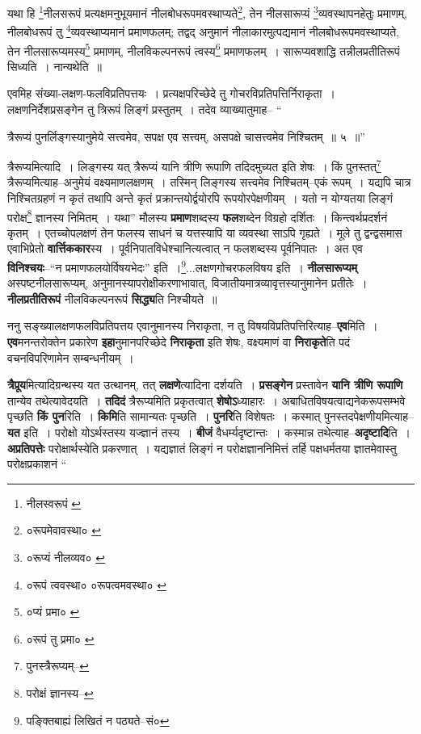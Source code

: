 \documentclass[article,12pt,a4paper]{memoir}
\begin{document}
	यथा हि \footnote{नीलस्वरूपं \cite{dp-msC} \cite{dp-msD}}नीलसरूपं प्रत्यक्षमनुभूयमानं नीलबोधरूपमवस्थाप्यते\footnote{०रूपमेवावस्था० \cite{dp-msC}}, तेन नीलसारूप्यं \footnote{०रूप्यं नीलव्यव० \cite{dp-msC}}व्यवस्थापनहेतुः प्रमाणम्, नीलबोधरूपं तु \footnote{०रूपं त्ववस्था० \cite{dp-msD} ०रूपत्वमवस्था० \cite{dp-msC}}व्यवस्थाप्यमानं प्रमाणफलम्; तद्वद् अनुमानं नीलाकारमुत्पद्यमानं नीलबोधरूपमवस्थाप्यते, तेन नीलसारूप्यमस्य\footnote{०प्यं प्रमा० \cite{dp-msC}} प्रमाणम्, नीलविकल्पनरूपं त्वस्य\footnote{०रूपं तु प्रमा० \cite{dp-msB} \cite{dp-msD}} प्रमाणफलम् । सारूप्यवशाद्धि तन्नीलप्रतीतिरूपं सिध्यति । नान्यथेति ॥ 
	  
	एवमिह संख्या-लक्षण-फलविप्रतिपत्तयः । प्रत्यक्षपरिच्छेदे तु गोचरविप्रतिपत्तिर्निराकृता । लक्षणनिर्देशप्रसङ्गेन तु त्रिरूपं लिङ्गं प्रस्तुतम् । तदेव व्याख्यातुमाह-- “
	  
	त्रैरूप्यं पुनर्लिङ्गस्यानुमेये सत्त्वमेव, सपक्ष एव सत्त्वम्, असपक्षे चासत्त्वमेव निश्चितम् ॥ ५ ॥” 
	  
	त्रैरूप्यमित्यादि । लिङ्गस्य यत् त्रैरूप्यं यानि त्रीणि रूपाणि तदिदमुच्यत इति शेषः । किं पुनस्तत्\footnote{पुनस्त्रैरूप्यम्--\cite{dp-msA}} त्रैरूप्यमित्याह--अनुमेयं वक्ष्यमाणलक्षणम् । तस्मिन् लिङ्गस्य सत्त्वमेव निश्चितम्--एकं रूपम् । यद्यपि चात्र निश्चितग्रहणं न कृतं तथापि अन्ते कृतं प्रक्रान्तयोर्द्वयोरपि रूपयोरपेक्षणीयम् । यतो न योग्यतया लिङ्गं परोक्ष\footnote{परोक्षं ज्ञानस्य--\cite{dp-msC}} ज्ञानस्य निमितम् । यथा” मौलस्य \textbf{प्रमाण}शब्दस्य \textbf{फल}शब्देन विग्रहो दर्शितः । किन्त्व\leavevmode{}र्थप्रदर्शनं कृतम् । एतच्चोपलक्षणं तेन फलस्य साधनं च यत्तस्यापि या व्यवस्था साऽपि गृह्यते । मूले तु द्वन्द्वसमास एवाभिप्रेतो \textbf{वार्त्तिककार}स्य । पूर्वनिपातविधेश्चानित्यत्वात् न फलशब्दस्य पूर्वनिपातः । अत एव \textbf{विनिश्चयः}--“न प्रमाणफलयोर्विषयभेदः” इति ।\footnote{पङ्क्तिबाह्यं लिखितं न पठ्यते--सं०}...लक्षणगोचरफलविषय इति । \textbf{नीलसारूप्यम्} अस्पष्टनीलसारूप्यम्, अनुमानस्यापरोक्षीकरणाभावात्, विजातीयमात्रव्यावृत्तस्यानुमानेन प्रतीतेः । \textbf{नीलप्रतीतिरूपं} नीलविकल्पनरूपं \textbf{सिद्ध्य}ति निश्चीयते ॥
	\pend
      

	  \pstart ननु सङ्ख्यालक्षणफलविप्रतिपत्तय एवानुमानस्य निराकृता, न तु विषयविप्रतिपत्तिरित्याह--\textbf{एव}मिति । \textbf{एव}मनन्तरोक्तेन प्रकारेण \textbf{इहा}नुमानपरिच्छेदे \textbf{निराकृता} इति शेषः, वक्ष्यमाणं वा \textbf{निराकृते}ति पदं वचनविपरिणामेन सम्बन्धनीयम् ।
	\pend
      

	  \pstart \textbf{त्रैप्रूय}मित्यादिग्रन्थस्य यत उत्थानम्, तत् \textbf{लक्षणे}त्यादिना दर्शयति । \textbf{प्रसङ्गेन} प्रस्तावेन \textbf{यानि त्रीणि रूपाणि} तान्येव तथेत्यावेदयति । \textbf{तदिदं} त्रैरूप्यमिति प्रकृतत्वात् \textbf{शेषोऽ}ध्याहारः । अबाधितविषयत्वाद्यनेकरूपसम्भवे पृच्छति \textbf{किं पुन}रिति । \textbf{किमि}ति सामान्यतः पृच्छति । \textbf{पुनरि}ति विशेषतः । कस्मात् पुनस्तदपेक्षणीयमित्याह--\textbf{यत} इति । परोक्षो योऽर्थस्तस्य यज्ज्ञानं तस्य । \textbf{बीजं} वैधर्म्यदृष्टान्तः । कस्मान्न तथेत्याह--\textbf{अदृष्टादि}ति । \textbf{अप्रतिपत्तेः} परोक्षार्थस्येति प्रकरणात् । यद्यज्ञातं लिङ्गं न परोक्षज्ञाननिमित्तं तर्हि पक्षधर्मतया ज्ञातमेवास्तु परोक्षप्रकाशनं  \leavevmode{} “
	  
\end{document}

